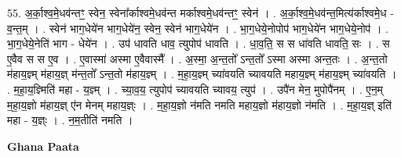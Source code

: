 \documentclass[17pt]{extarticle}
\begin{document}
55. अ॒र्का॒श्व॒मे॒धव॑न्तꣳ॒॒ स्वेन॒ स्वेना᳚र्काश्वमे॒धव॑न्त मर्काश्वमे॒धव॑न्तꣳ॒॒ स्वेन॑ । . अ॒र्का॒श्व॒मे॒धव॑न्त॒मित्य॑र्काश्वमे॒ध - व॒न्त॒म् । . स्वेन॑ भाग॒धेये॑न भाग॒धेये॑न॒ स्वेन॒ स्वेन॑ भाग॒धेये॑न । . भा॒ग॒धेये॒नोपोप॑ भाग॒धेये॑न भाग॒धेये॒नोप॑ । . भा॒ग॒धेये॒नेति॑ भाग - धेये॑न । . उप॑ धावति धाव॒ त्युपोप॑ धावति । . धा॒व॒ति॒ स स धा॑वति धावति॒ सः । . स ए॒वैव स स ए॒व । . ए॒वास्मा॑ अस्मा ए॒वैवास्मै᳚ । . अ॒स्मा॒ अ॒न्त॒तो᳚ ऽन्त॒तो᳚ ऽस्मा अस्मा अन्त॒तः । . अ॒न्त॒तो म॑हाय॒ज्ञ्म् म॑हाय॒ज्ञ् म॑न्त॒तो᳚ ऽन्त॒तो म॑हाय॒ज्ञ्म् । . म॒हा॒य॒ज्ञ्म् च्या॑वयति च्यावयति महाय॒ज्ञ्म् म॑हाय॒ज्ञ्म् च्या॑वयति । . म॒हा॒य॒ज्ञ्मिति॑ महा - य॒ज्ञ्म् । . च्या॒व॒य॒ त्युपोप॑ च्यावयति च्यावय॒ त्युप॑ । . उपै॑न मेन॒ मुपोपै॑नम् । . ए॒न॒म् म॒हा॒य॒ज्ञो म॑हाय॒ज्ञ् ए॑न मेनम् महाय॒ज्ञ्ः । . म॒हा॒य॒ज्ञो न॑मति नमति महाय॒ज्ञो म॑हाय॒ज्ञो न॑मति । . म॒हा॒य॒ज्ञ् इति॑ महा - य॒ज्ञ्ः । . न॒म॒तीति॑ नमति । \newline

\textbf{Ghana Paata } \newline
\end{document}
